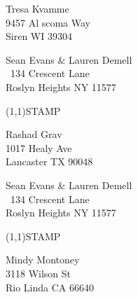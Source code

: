 \documentclass[12pt]{article}
\begin{document}
\begin{center} \begin{Huge} \vspace*{\fill}
Tresa Kvamme\\
9457 Al scoma Way\\
Siren WI 39304\\
\vspace{\fill} \end{Huge} \end{center}

\clearpage

\begin{minipage}{.5\linewidth} \noindent
Sean Evans \& Lauren Demell\\\ 
134 Crescent Lane\\ 
Roslyn Heights NY 11577
\end{minipage}
\begin{minipage}{.5\linewidth \hspace{-.2in} \vspace{-.3in}}
\begin{flushright}
\framebox(1,1){STAMP}
\end{flushright}
\end{minipage}

\begin{center} \begin{Huge} \vspace*{\fill}
Rashad Grav\\
1017 Healy Ave\\
Lancaster TX 90048\\
\vspace{\fill} \end{Huge} \end{center}

\clearpage

\begin{minipage}{.5\linewidth} \noindent
Sean Evans \& Lauren Demell\\\ 
134 Crescent Lane\\ 
Roslyn Heights NY 11577
\end{minipage}
\begin{minipage}{.5\linewidth \hspace{-.2in} \vspace{-.3in}}
\begin{flushright}
\framebox(1,1){STAMP}
\end{flushright}
\end{minipage}

\begin{center} \begin{Huge} \vspace*{\fill}
Mindy Montoney\\
3118 Wilson St\\
Rio Linda CA 66640\\
\vspace{\fill} \end{Huge} \end{center}
\end{document}

